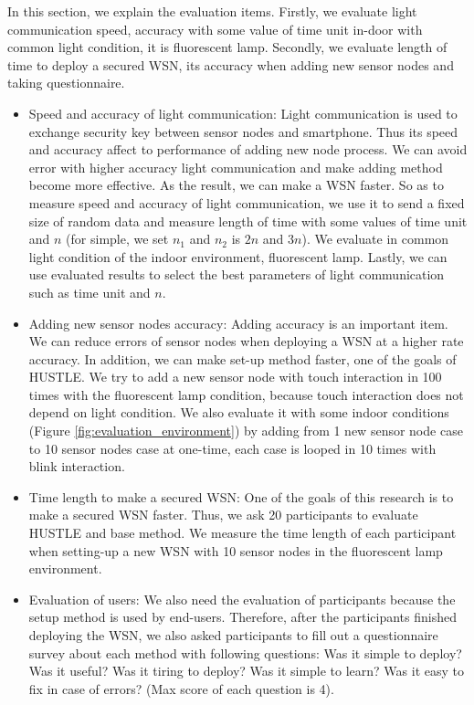 In this section, we explain the evaluation items. Firstly, we evaluate light communication speed, accuracy with some value of time unit in-door with common light condition, it is fluorescent lamp. Secondly, we evaluate length of time to deploy a secured WSN, its accuracy when adding new sensor nodes and taking questionnaire.
\begin{itemize}
\item Speed and accuracy of light communication: Light communication is used to exchange security key between sensor nodes and smartphone. Thus its speed and accuracy affect to performance of adding new node process. We can avoid error with higher accuracy light communication and make adding method become more effective. As the result, we can make a WSN faster. So as to measure speed and accuracy of light communication, we use it to send a fixed size of random data and measure length of time with some values of time unit and $n$ (for simple, we set $n_1$ and $n_2$ is $2n$ and $3n$). We evaluate in common light condition of the indoor environment, fluorescent lamp. Lastly, we can use evaluated results to select the best parameters of light communication such as time unit and $n$.
\item Adding new sensor nodes accuracy: Adding accuracy is an important item. We can reduce errors of sensor nodes when deploying a WSN at a higher rate accuracy. In addition, we can make set-up method faster, one of the goals of HUSTLE. We try to add a new sensor node with touch interaction in 100 times with the fluorescent lamp condition, because touch interaction does not depend on light condition. We also evaluate it with some indoor conditions (Figure \ref{fig:evaluation_environment}) by adding from 1 new sensor node case to 10 sensor nodes case at one-time, each case is looped in 10 times with blink interaction.
\item Time length to make a secured WSN: One of the goals of this research is to make a secured WSN faster. Thus, we ask 20 participants to evaluate HUSTLE and base method. We measure the time length of each participant when setting-up a new WSN with 10 sensor nodes in the fluorescent lamp environment.
\item Evaluation of users: We also need the evaluation of participants because the setup method is used by end-users. Therefore, after the participants finished deploying the WSN, we also asked participants to fill out a questionnaire survey about each method with following questions: Was it simple to deploy? Was it useful? Was it tiring to deploy? Was it simple to learn? Was it easy to fix in case of errors? (Max score of each question is 4).
\end{itemize}

